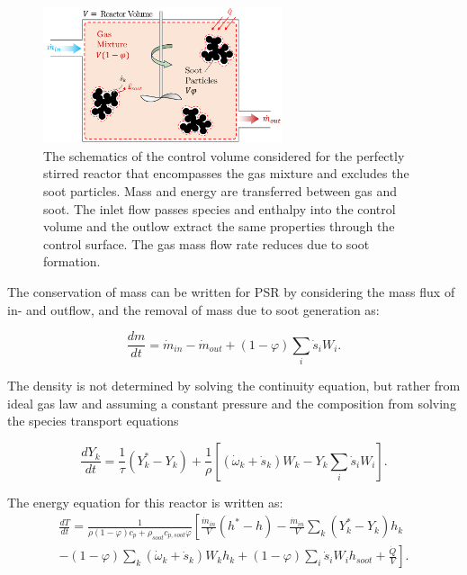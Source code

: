 \begin{figure}[!htbp]
	\centering
	\includegraphics[height=40mm, ]{Figures/Theory/PSR.pdf}
	\caption{The schematics of the control volume considered for the perfectly stirred reactor that encompasses the gas mixture and excludes the soot particles. Mass and energy are transferred between gas and soot. The inlet flow passes species and enthalpy into the control volume and the outlow extract the same properties through the control surface. The gas mass flow rate reduces due to soot formation.}
	\label{fig:psrcv}
\end{figure}

The conservation of mass can be written for PSR by considering the mass flux of in- and outflow, and the removal of mass due to soot generation as:

\begin{equation}
	\frac{d m}{d t}
	=
	\dot{m}_{in} - \dot{m}_{out} 
	+ (1-\varphi) \sum_i \dot{s}_i W_i 
	\label{eqn:contpsr}.
\end{equation}

The density is not determined by solving the continuity equation, but rather from ideal gas law and assuming a constant pressure and the composition from solving the species transport equations

\begin{equation}
	\frac{d Y_k}{d t}
	=
	\frac{1}{\tau}
	\left( Y^*_k-Y_k \right)+
	\frac{1}{\rho}\left[\left(\dot{\omega}_k+\dot{s}_k\right) W_k-Y_k \sum_i \dot{s}_i W_i\right]
	\label{eqn:speciespsr}.
\end{equation}

The energy equation for this reactor is written as:
\begin{equation}
	\begin{split}
		\frac{dT}{dt}
		=
		\frac{1}
		{
			\rho\left(1-\varphi\right)c_p+\rho_{soot}c_{p,soot}\varphi
		}
		\left[
		\frac{{\dot{m}}_{in}}{V}
		\left(h^\ast-h\right)
		-
		\frac{{\dot{m}}_{in}}{V}\sum_{k}\left(Y_k^\ast-Y_k\right)h_k
		\right.\\
		\left.	
		-
		\left(1-\varphi\right)\sum_{k}{
			\left(
			{\dot{\omega}}_k
			+
			{\dot{s}}_k
			\right) W_k h_k}
		+\left(1-\varphi\right) \sum_{i}{{\dot{s}}_i W_i} h_{soot}+\frac{\dot{Q}}{V}
		\right].
	\end{split}
		\label{eqn:energypsr}
\end{equation}

